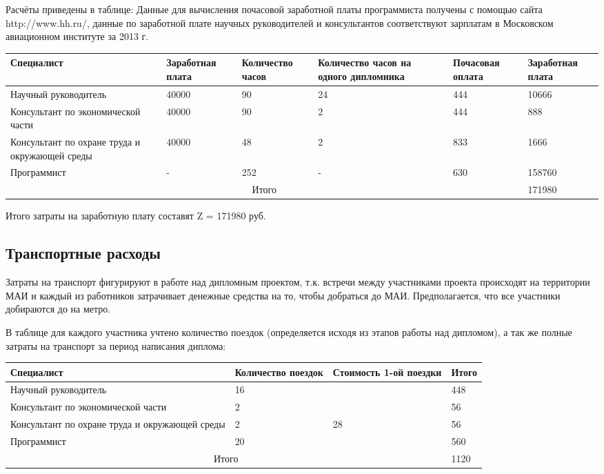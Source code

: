 Расчёты приведены в таблице: Данные для вычисления почасовой зара\-ботной платы программиста получены с помощью сайта http://www.hh.ru/, данные по заработной плате научных руководителей и консультантов соот\-ветствуют зарплатам в Московском авиационном институте за 2013 г.
\begin{table}[H]
\begin{center}
\begin{tabular}{|p{3.5cm}|p{1.8cm}|p{1.6cm}|p{2.8cm}|p{2.1cm}|p{1.8cm}|}
\hline
Специалист&
Заработ\-ная плата&
Коли\-чество часов &
Количество часов на одного дипломника&
Почасовая оплата&
Заработ\-ная плата\\
\hline
Научный руководитель&
40000&
90&
24&
444&
10666\\
\hline
Консультант по экономической части&
40000&
90&
2&
444&
888\\
\hline
Консультант по охране труда и окружающей среды&
40000&
48&
2&
833&
1666\\
\hline
Программист&
-&
252&
-&
630&
158760\\
\hline
\multicolumn{5}{|c|}{Итого}&
171980\\
\hline
\end{tabular}
\end{center}
\end{table}

Итого затраты на заработную плату составят Z = 171980 руб.

\subsection{Транспортные расходы}

Затраты на транспорт фигурируют в работе над дипломным проектом, т.к. встречи между участниками проекта происходят на территории МАИ и каждый из работников затрачивает денежные средства на то, чтобы добраться до МАИ. Предполагается, что все участники добираются до на метро.

В таблице для каждого участника учтено количество поездок (опреде\-ляется исходя из этапов работы над дипломом), а так же полные затраты на транспорт за период написания диплома:
\begin{table}[H]
\begin{center}
\begin{tabular}{|p{3.5cm}|p{2.8cm}|p{2.6cm}|p{2.8cm}|}
\hline
Специалист&
Количество поездок&
Стоимость 1-ой поездки&
Итого\\
\hline
Научный руководитель&
16&
&
448\\
\cline{1-2}\cline{4-4}
Консультант по экономической части&
2&
&

56
\\
\cline{1-2}\cline{4-4}
Консультант по охране труда и окружающей среды&
2&
28
&
56
\\
\cline{1-2}\cline{4-4}
Программист&
20&
&
560\\
\hline
\multicolumn{3}{|c|}{Итого}&
1120\\
\hline
\end{tabular}
\end{center}
\end{table}

